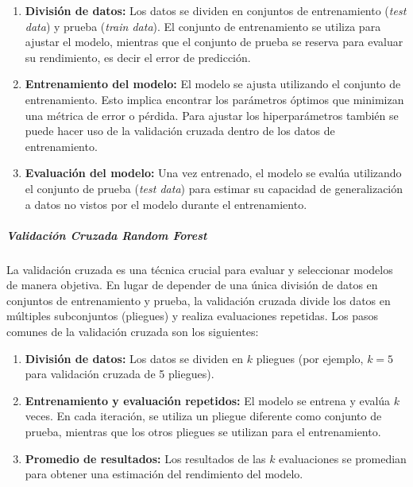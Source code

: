 \begin{enumerate}  
  \item \textbf{División de datos:} Los datos se dividen en conjuntos de entrenamiento (\textit{test data}) y prueba (\textit{train data}). El conjunto de entrenamiento se utiliza para ajustar el modelo, mientras que el conjunto de prueba se reserva para evaluar su rendimiento, es decir el error de predicción.
  
  \item \textbf{Entrenamiento del modelo:} El modelo se ajusta utilizando el conjunto de entrenamiento. Esto implica encontrar los parámetros óptimos que minimizan una métrica de error o pérdida. Para ajustar los hiperparámetros también se puede hacer uso de la validación cruzada dentro de los datos de entrenamiento.
  
  \item \textbf{Evaluación del modelo:} Una vez entrenado, el modelo se evalúa utilizando el conjunto de prueba (\textit{test data}) para estimar su capacidad de generalización a datos no vistos por el modelo durante el entrenamiento.
\end{enumerate}

\subparagraph{Validación Cruzada Random Forest}

La validación cruzada es una técnica crucial para evaluar y seleccionar modelos de manera objetiva. En lugar de depender de una única división de datos en conjuntos de entrenamiento y prueba, la validación cruzada divide los datos en múltiples subconjuntos (pliegues) y realiza evaluaciones repetidas. Los pasos comunes de la validación cruzada son los siguientes:

\begin{enumerate}
  \item \textbf{División de datos:} Los datos se dividen en $k$ pliegues (por ejemplo, $k=5$ para validación cruzada de 5 pliegues).
  
  \item \textbf{Entrenamiento y evaluación repetidos:} El modelo se entrena y evalúa $k$ veces. En cada iteración, se utiliza un pliegue diferente como conjunto de prueba, mientras que los otros pliegues se utilizan para el entrenamiento.
  
  \item \textbf{Promedio de resultados:} Los resultados de las $k$ evaluaciones se promedian para obtener una estimación del rendimiento del modelo.
\end{enumerate}

